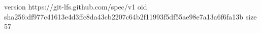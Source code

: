 version https://git-lfs.github.com/spec/v1
oid sha256:df977c41613e4d3ffc8da43cb2207c64b2f11993f5df55ae98e7a13a6f6fa13b
size 57
